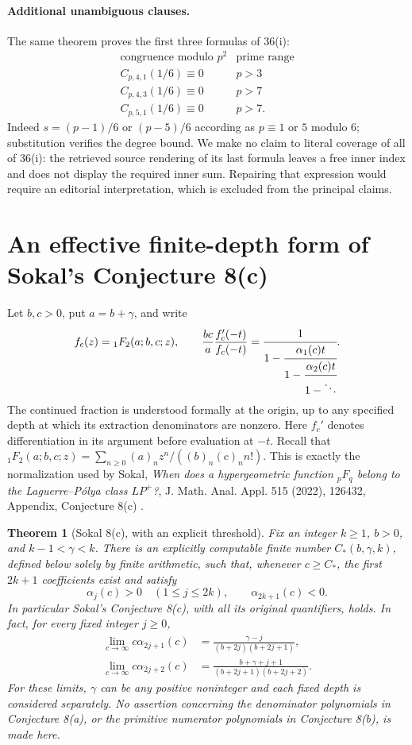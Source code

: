 \documentclass[11pt,a4paper]{article}
\newtheorem{theorem}{Theorem}[section]
\theoremstyle{remark}
\begin{document}
\paragraph{Additional unambiguous clauses.}
The same theorem proves the first three formulas of 36(i):
\[
\begin{array}{c|c}
\text{congruence modulo }p^2&\text{prime range}\\\hline
C_{p,4,1}(1/6)\equiv0&p>3\\
C_{p,4,3}(1/6)\equiv0&p>7\\
C_{p,5,1}(1/6)\equiv0&p>7.
\end{array}
\]
Indeed $s=(p-1)/6$ or $(p-5)/6$ according as $p\equiv1$ or $5$
modulo $6$; substitution verifies the degree bound. We make no claim
to literal coverage of all of 36(i): the retrieved source rendering
of its last formula leaves a free inner index and does not display
the required inner sum. Repairing that expression would require an
editorial interpretation, which is excluded from the principal claims.
\section{An effective finite-depth form of Sokal's Conjecture 8(c)}

Let $b,c>0$, put $a=b+\gamma$, and write
\[
 f_c(z)={}_1F_2(a;b,c;z),\qquad
 \frac{bc}{a}\frac{f_c'(-t)}{f_c(-t)}
 =\cfrac{1}{1-\cfrac{\alpha_1(c)t}{1-\cfrac{\alpha_2(c)t}{1-\ddots}}}.
\]
The continued fraction is understood formally at the origin, up to any
specified depth at which its extraction denominators are nonzero.
Here $f_c'$ denotes differentiation in its argument before evaluation
at $-t$. Recall that
${}_1F_2(a;b,c;z)=\sum_{n\ge0}(a)_n z^n/((b)_n(c)_n n!)$.
This is exactly the normalization used by Sokal, \emph{When does a
hypergeometric function ${}_pF_q$ belong to the Laguerre--P\'olya class
$LP^+$?}, J. Math. Anal. Appl. 515 (2022), 126432, Appendix,
Conjecture 8(c) \cite{sokal2022}.

\begin{theorem}[Sokal 8(c), with an explicit threshold]\label{thm:sokal}
Fix an integer $k\ge1$, $b>0$, and $k-1<\gamma<k$. There is an explicitly
computable finite number $C_*(b,\gamma,k)$, defined below solely by finite
arithmetic, such that, whenever $c\ge C_*$, the first $2k+1$ coefficients
exist and satisfy
\[
 \alpha_j(c)>0\quad(1\le j\le2k),\qquad \alpha_{2k+1}(c)<0.
\]
In particular Sokal's Conjecture 8(c), with all its original quantifiers,
holds. In fact, for every fixed integer $j\ge0$,
\begin{align*}
 \lim_{c\to\infty}c\alpha_{2j+1}(c)
   &=\frac{\gamma-j}{(b+2j)(b+2j+1)},\\
 \lim_{c\to\infty}c\alpha_{2j+2}(c)
   &=\frac{b+\gamma+j+1}{(b+2j+1)(b+2j+2)}.
\end{align*}
For these limits, $\gamma$ can be any positive noninteger and each fixed
depth is considered separately. No assertion concerning the denominator
polynomials in Conjecture 8(a), or the primitive numerator polynomials in
Conjecture 8(b), is made here.
\end{theorem}
\end{document}
